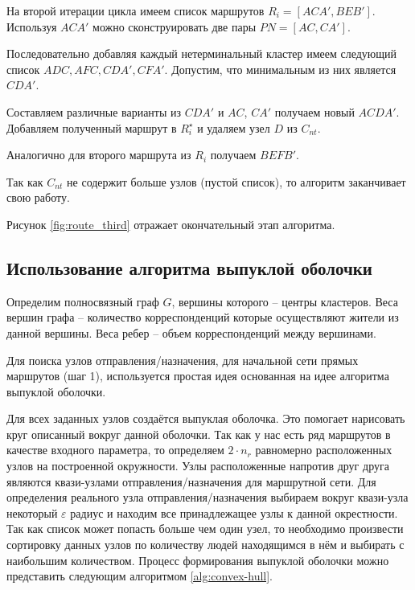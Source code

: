 На второй итерации цикла имеем список маршрутов \( R_i = [ACA', BEB'] \). Используя \( ACA' \) можно 
сконструировать две пары \( PN=[AC, CA'] \).

Последовательно добавляя каждый нетерминальный кластер имеем следующий список \( ADC, AFC, CDA', CFA' \). 
Допустим, что минимальным из них является \( CDA' \).

Составляем различные варианты из \( CDA' \) и \( AC \), \( CA' \) получаем новый \( ACDA' \). Добавляем 
полученный маршрут в \( R^{\star}_i \) и удаляем узел \( D \) из \( C_{nt} \).

Аналогично для второго маршрута из \( R_i \) получаем \( BEFB' \).

Так как \( C_{nt} \) не содержит больше узлов (пустой список), то алгоритм заканчивает свою работу.

Рисунок \ref{fig:route_third} отражает окончательный этап алгоритма.

\subsection{Использование алгоритма выпуклой оболочки}
Определим полносвязный граф \( G \), вершины которого -- центры кластеров. Веса вершин графа -- количество 
корреспонденций которые осуществляют жители из данной вершины. Веса ребер -- объем корреспонденций между 
вершинами.

Для поиска узлов отправления/назначения, для начальной сети прямых маршрутов (шаг 1), используется простая 
идея основанная на идее алгоритма выпуклой оболочки.

Для всех заданных узлов создаётся выпуклая оболочка. Это помогает нарисовать круг описанный вокруг данной
оболочки. Так как у нас есть ряд маршрутов в качестве входного параметра, то определяем \( 2\cdot n_r \) 
равномерно расположенных узлов на построенной окружности. Узлы расположенные напротив друг друга являются 
квази-узлами отправления/назначения для маршрутной сети. Для определения реального узла отправления/назначения 
выбираем вокруг квази-узла некоторый \( \varepsilon \) радиус и находим все принадлежащее узлы к данной 
окрестности. Так как список может попасть больше чем один узел, то необходимо произвести сортировку данных 
узлов по количеству людей находящимся в нём и выбирать с наибольшим количеством. Процесс формирования 
выпуклой оболочки можно представить следующим алгоритмом \ref{alg:convex-hull}.

